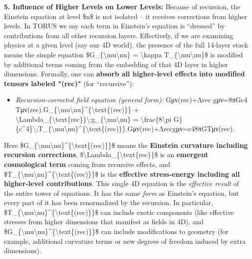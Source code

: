 \documentclass[
]{article}
\begin{document}
\textbf{5. Influence of Higher Levels on Lower Levels:} Because of
recursion, the Einstein equation at level \$n\$ is not isolated -- it
receives corrections from higher levels. In TORUS we say each term in
Einstein's equation is ``dressed'' by contributions from all other
recursion layers\hspace{0pt}. Effectively, if we are examining physics
at a given level (say our 4D world), the presence of the full 14-layer
stack means the simple equation
\$G\_\{\textbackslash mu\textbackslash nu\} = \textbackslash kappa
T\_\{\textbackslash mu\textbackslash nu\}\$ is modified by additional
terms coming from the embedding of that 4D layer in higher dimensions.
Formally, one can \textbf{absorb all higher-level effects into modified
tensors labeled "(rec)"} (for ``recursive'')\hspace{0pt}:

\begin{itemize}
\item
  \emph{Recursion-corrected field equation (general form):}
  Gμν(rec)+Λrec  gμν=8πGc4  Tμν(rec).G\_\{\textbackslash mu\textbackslash nu\}\^{}\{\textbackslash text\{(rec)\}\}
  +
  \textbackslash Lambda\_\{\textbackslash text\{rec\}\}\textbackslash;g\_\{\textbackslash mu\textbackslash nu\}
  = \textbackslash frac\{8\textbackslash pi
  G\}\{c\^{}4\}\textbackslash;T\_\{\textbackslash mu\textbackslash nu\}\^{}\{\textbackslash text\{(rec)\}\}.Gμν(rec)\hspace{0pt}+Λrec\hspace{0pt}gμν\hspace{0pt}=c48πG\hspace{0pt}Tμν(rec)\hspace{0pt}.
\end{itemize}

Here
\$G\_\{\textbackslash mu\textbackslash nu\}\^{}\{\textbackslash text\{(rec)\}\}\$
means the \textbf{Einstein curvature including recursion corrections},
\$\textbackslash Lambda\_\{\textbackslash text\{rec\}\}\$ is an
\textbf{emergent cosmological term} coming from recursive effects, and
\$T\_\{\textbackslash mu\textbackslash nu\}\^{}\{\textbackslash text\{(rec)\}\}\$
is the \textbf{effective stress-energy including all higher-level
contributions}\hspace{0pt}. This single 4D equation is the
\emph{effective result} of the entire tower of equations. It has the
same \emph{form} as Einstein's equation, but every part of it has been
renormalized by the recursion. In particular,
\$T\_\{\textbackslash mu\textbackslash nu\}\^{}\{\textbackslash text\{(rec)\}\}\$
can include exotic components (like effective stresses from higher
dimensions that manifest as fields in 4D), and
\$G\_\{\textbackslash mu\textbackslash nu\}\^{}\{\textbackslash text\{(rec)\}\}\$
can include modifications to geometry (for example, additional curvature
terms or new degrees of freedom induced by extra dimensions).
\end{document}
